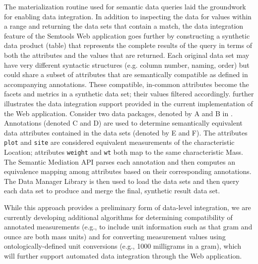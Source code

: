  The materialization routine used for
semantic data queries laid the groundwork for enabling data
integration. In addition to inspecting the data for values within a
range and returning the data sets that contain a match, the data
integration feature of the Semtools Web application goes further by
constructing a synthetic data product (table) that represents the
complete results of the query in terms of both the attributes and the
values that are returned. Each original data set may have very
different syntactic structures (e.g. column number, naming, order) but
could share a subset of attributes that are semantically compatible as
defined in accompanying annotations. These compatible, in-common
attributes become the facets and metrics in a synthetic data set; their
values filtered accordingly.  further
illustrates the data integration support provided in the current
implementation of the Web application. Consider two data packages,
denoted by A and B in .  Annotations (denoted
C and D) are used to determine semantically equivalent data attributes
contained in the data sets (denoted by E and F). The attributes {\tt
  plot} and {\tt site} are considered equivalent measurements of the
characteristic Location; attributes {\tt weight} and {\tt wt} both map
to the same characteristic Mass. The Semantic Mediation API parses
each annotation and then computes an equivalence mapping among
attributes based on their corresponding annotations. The Data Manager
Library is then used to load the data sets and then query each data
set to produce and merge the final, synthetic result data set. 

While this approach provides a preliminary form of data-level
integration, we are currently developing additional algorithms for
determining compatibility of annotated measurements (e.g., to include
unit information such as that gram and ounce are both mass units) and
for converting measurement values using ontologically-defined unit
conversions (e.g., 1000 milligrams in a gram), which will further
support automated data integration through the Web application.


